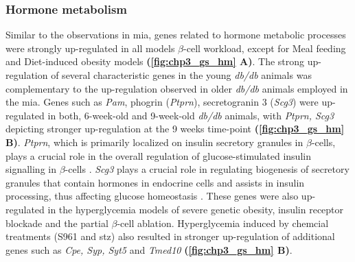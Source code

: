 
\subsubsection{Hormone metabolism}
\label{subsec:hormone}
Similar to the observations in \gls{mia}, genes related to hormone metabolic processes were strongly up-regulated in all models $\beta$-cell workload, except for Meal feeding and Diet-induced obesity models \textbf{(\autoref{fig:chp3_gs_hm} A)}. The strong up-regulation of several characteristic genes in the young \textit{db/db} animals was complementary to the up-regulation observed in older \textit{db/db} animals employed in the \gls{mia}. Genes such as \textit{Pam}, phogrin (\textit{Ptprn}), secretogranin 3 (\textit{Scg3}) were up-regulated in both, 6-week-old and 9-week-old \textit{db/db} animals, with \textit{Ptprn, Scg3} depicting stronger up-regulation at the 9 weeks time-point \textbf{(\autoref{fig:chp3_gs_hm} B)}. \textit{Ptprn}, which is primarily localized on insulin secretory granules in $\beta$-cells, plays a crucial role in the overall regulation of glucose-stimulated insulin signalling in $\beta$-cells \textbf{\cite{torii_pseudophosphatase_2018}}. \textit{Scg3} plays a crucial role in regulating biogenesis of secretory granules that contain hormones in endocrine cells and assists in insulin processing, thus affecting glucose homeostasis \textbf{\cite{lin_serum_2019}}. These genes were also up-regulated in the hyperglycemia models of severe genetic obesity, insulin receptor blockade and the partial $\beta$-cell ablation. Hyperglycemia induced by chemcial treatments (S961 and \gls{stz}) also resulted in stronger up-regulation of additional genes such as \textit{Cpe, Syp, Syt5} and \textit{Tmed10} \textbf{(\autoref{fig:chp3_gs_hm} B)}.


